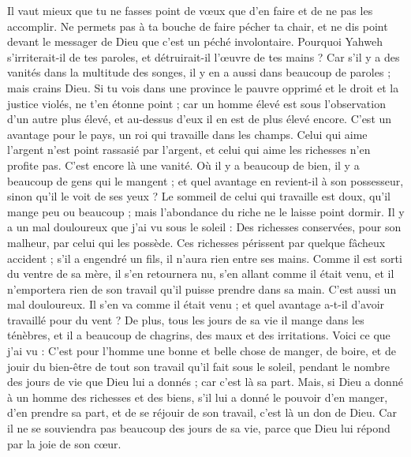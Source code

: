 \begin{multicols}{2}
Il vaut mieux que tu ne fasses point de vœux que d'en faire et de ne pas les accomplir.
Ne permets pas à ta bouche de faire pécher ta chair, et ne dis point devant le messager de Dieu que c'est un péché involontaire. Pourquoi Yahweh s’irriterait-il de tes paroles, et détruirait-il l'œuvre de tes mains ?
Car s’il y a des vanités dans la multitude des songes, il y en a aussi dans beaucoup de paroles ; mais crains Dieu.
Si tu vois dans une province le pauvre opprimé et le droit et la justice violés, ne t’en étonne point ; car un homme élevé est sous l'observation d’un autre plus élevé, et au-dessus d’eux il en est de plus élevé encore.
C’est un avantage pour le pays, un roi qui travaille dans les champs.
Celui qui aime l'argent n'est point rassasié par l'argent, et celui qui aime les richesses n’en profite pas. C’est encore là une vanité.
Où il y a beaucoup de bien, il y a beaucoup de gens qui le mangent ; et quel avantage en revient-il à son possesseur, sinon qu'il le voit de ses yeux ?
Le sommeil de celui qui travaille est doux, qu'il mange peu ou beaucoup ; mais l’abondance du riche ne le laisse point dormir.
Il y a un mal douloureux que j'ai vu sous le soleil : Des richesses conservées, pour son malheur, par celui qui les possède.
Ces richesses périssent par quelque fâcheux accident ; s’il a engendré un fils, il n'aura rien entre ses mains.
Comme il est sorti du ventre de sa mère, il s'en retournera nu, s'en allant comme il était venu, et il n'emportera rien de son travail qu’il puisse prendre dans sa main.
C'est aussi un mal douloureux. Il s’en va comme il était venu ; et quel avantage a-t-il d'avoir travaillé pour du vent ?
De plus, tous les jours de sa vie il mange dans les ténèbres, et il a beaucoup de chagrins, des maux et des irritations.
Voici ce que j'ai vu : C'est pour l’homme une bonne et belle chose de manger, de boire, et de jouir du bien-être de tout son travail qu'il fait sous le soleil, pendant le nombre des jours de vie que Dieu lui a donnés ; car c'est là sa part.
Mais, si Dieu a donné à un homme des richesses et des biens, s’il lui a donné le pouvoir d’en manger, d’en prendre sa part, et de se réjouir de son travail, c'est là un don de Dieu.
Car il ne se souviendra pas beaucoup des jours de sa vie, parce que Dieu lui répond par la joie de son cœur.

\end{multicols}
